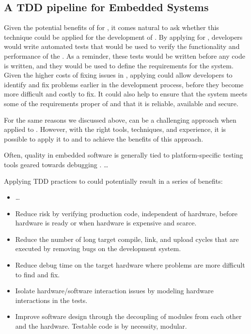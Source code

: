 \subsection{A TDD pipeline for Embedded Systems}
Given the potential benefits of \tdd for \noess, it comes natural to ask whether this technique could be applied for the development of \ess. By applying \tdd for \ess, developers would write automated tests that would be used to verify the functionality and performance of the \es. As a reminder, these tests would be written before any code is written, and they would be used to define the requirements for the system. 
Given the higher costs of fixing issues in \ess, applying \tdd could allow developers to identify and fix problems earlier in the development process, before they become more difficult and costly to fix. It could also help to ensure that the system meets some of the requirements proper of \ess and that it is reliable, available and secure.

For the same reasons we discussed above, \tdd can be a challenging approach when applied to \ess. However, with the right tools, techniques, and experience, it is possible to apply it to \ess and to achieve the benefits of this approach.

Often, quality in embedded software is generally tied to platform-specific testing tools geared towards debugging \cite{TDDEmbeddedSoftware}.
\dots


Applying TDD practices to \ess could potentially result in a series of benefits:
\begin{itemize}
    \item \dots
\end{itemize}


\begin{itemize}
    \item Reduce risk by verifying production code, independent of hardware, before hardware is ready or when hardware is expensive and scarce.
    \item Reduce the number of long target compile, link, and upload cycles that are executed by removing bugs on the development system.
    \item Reduce debug time on the target hardware where problems are more difficult to find and fix.
    \item Isolate hardware/software interaction issues by modeling hardware interactions in the tests.
    \item Improve software design through the decoupling of modules from each other and the hardware. Testable code is by necessity, modular.
\end{itemize}


